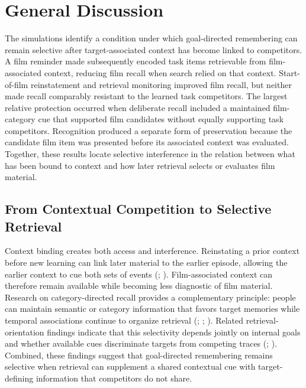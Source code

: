 \documentclass[
  man,
  floatsintext,
  longtable,
  nolmodern,
  notxfonts,
  notimes,
  draftfirst,
  colorlinks=true,linkcolor=blue,citecolor=blue,urlcolor=blue]{apa7}
\begin{document}
\section{General Discussion}\label{general-discussion}

The simulations identify a condition under which goal-directed
remembering can remain selective after target-associated context has
become linked to competitors. A film reminder made subsequently encoded
task items retrievable from film-associated context, reducing film
recall when search relied on that context. Start-of-film reinstatement
and retrieval monitoring improved film recall, but neither made recall
comparably resistant to the learned task competitors. The largest
relative protection occurred when deliberate recall included a
maintained film-category cue that supported film candidates without
equally supporting task competitors. Recognition produced a separate
form of preservation because the candidate film item was presented
before its associated context was evaluated. Together, these results
locate selective interference in the relation between what has been
bound to context and how later retrieval selects or evaluates film
material.

\subsection{From Contextual Competition to Selective
Retrieval}\label{from-contextual-competition-to-selective-retrieval}

Context binding creates both access and interference. Reinstating a
prior context before new learning can link later material to the earlier
episode, allowing the earlier context to cue both sets of events
(;
).
Film-associated context can therefore remain available while becoming
less diagnostic of film material. Research on category-directed recall
provides a complementary principle: people can maintain semantic or
category information that favors target memories while temporal
associations continue to organize retrieval
(;
;
). Related
retrieval-orientation findings indicate that this selectivity depends
jointly on internal goals and whether available cues discriminate
targets from competing traces (; ).
Combined, these findings suggest that goal-directed remembering remains
selective when retrieval can supplement a shared contextual cue with
target-defining information that competitors do not share.
\end{document}
